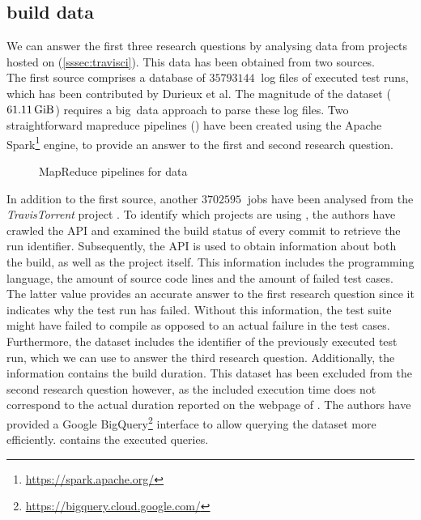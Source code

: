 
\subsection{\travisci{} build data}
We can answer the first three research questions by analysing data from projects hosted on \travisci{} (\cref{sssec:travisci}). This data has been obtained from two sources.\\

\noindent The first source comprises a database \cite{travisanalysis} of $\SI{35793144}{}$ log files of executed test runs, which has been contributed by Durieux et al. The magnitude of the dataset ($\SI{61.11}{\gibi\byte}$) requires a \mbox{big data} approach to parse these log files. Two straightforward \Gls{mapreduce} pipelines () have been created using the Apache Spark\footnote{\url{https://spark.apache.org/}} engine, to provide an answer to the first and second research question.

\begin{figure}[htbp!]
	\centering
	\newline
	\caption{MapReduce pipelines for \travisci{} data}
	\label{fig:eval-mapreduce}
\end{figure}

\noindent In addition to the first source, another $\SI{3702595}{}$ jobs have been analysed from the \mbox{\emph{TravisTorrent}} project \cite{msr17challenge}. To identify which projects are using \travisci{}, the authors have crawled the \github{} API and examined the build status of every commit to retrieve the run identifier.
Subsequently, the \travisci{} API is used to obtain information about both the build, as well as the project itself. This information includes the programming language, the amount of source code lines and the amount of failed test cases. The latter value provides an accurate answer to the first research question since it indicates why the test run has failed. Without this information, the test suite might have failed to compile as opposed to an actual failure in the test cases. Furthermore, the dataset includes the identifier of the previously executed test run, which we can use to answer the third research question. Additionally, the information contains the build duration. This dataset has been excluded from the second research question however, as the included execution time does not correspond to the actual duration reported on the webpage of \travisci{}. The authors have provided a Google BigQuery\footnote{\url{https://bigquery.cloud.google.com/}} interface to allow querying the dataset more efficiently.  contains the executed queries.
